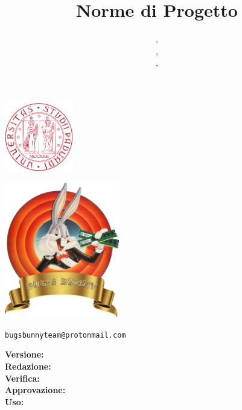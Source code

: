 \documentclass{classes/base}
\title{Norme di Progetto}
\author{\matteo, \\ \marcov, \\ \giulio, \\ \marcob}
\begin{document}
	\begin{titlepage}
		\makeatletter
		
		\begin{minipage}[]{0.3\textwidth}
			\includegraphics[width=3cm]{assets/unipd}
		\end{minipage}
		\begin{minipage}[]{0.7\textwidth}
		\end{minipage}
		\begin{center}
			
			\includegraphics[width=5cm]{assets/logo}
			
			\Huge
			\textbf{\teamname}
			
			\vspace{2cm}
			
			\textbf{\@title}

			\vspace{1cm}
			
			\small
			\texttt{bugsbunnyteam@protonmail.com}

			\vspace{1.5cm}
			\Large
			
			\ifdefined\@versione
			\textbf{Versione:} \@versione \\
			\fi
			\textbf{Redazione:} \@author \\
			\textbf{Verifica:} \@verificatore \\
			\textbf{Approvazione:} \@approvatore \\
			\textbf{Uso:} \@uso \\
			
			\vfill
			\makeatother
		\end{center}
	\end{titlepage}
	
\end{document}

